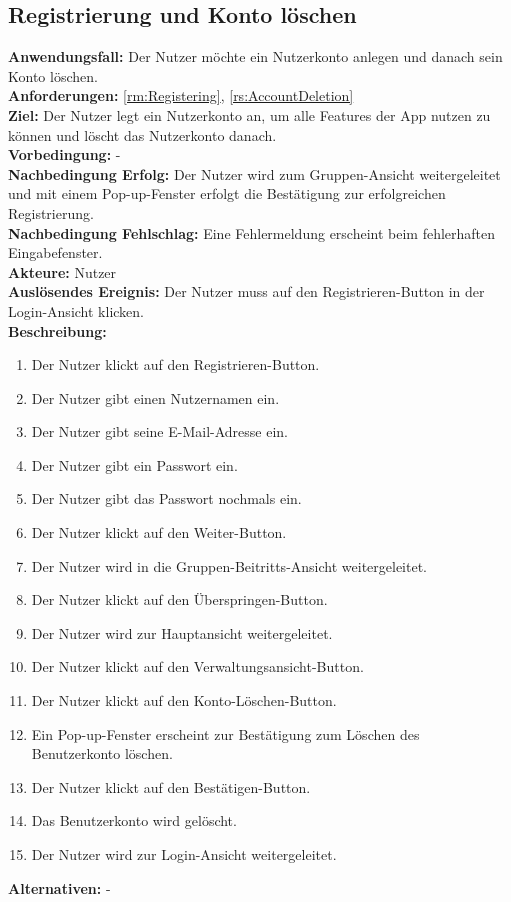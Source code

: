 \documentclass[parskip=full]{scrartcl}
\begin{document}
\subsection{Registrierung und Konto löschen}
\textbf{Anwendungsfall:} Der Nutzer möchte ein Nutzerkonto anlegen und danach sein Konto löschen.\\
\textbf{Anforderungen:} \ref{rm:Registering}, \ref{rs:AccountDeletion} \\
\textbf{Ziel:} Der Nutzer legt ein Nutzerkonto an, um alle Features der App nutzen zu können und löscht das Nutzerkonto danach.\\
\textbf{Vorbedingung:} -\\
\textbf{Nachbedingung Erfolg:} Der Nutzer wird zum Gruppen-Ansicht weitergeleitet und mit einem Pop-up-Fenster erfolgt die Bestätigung zur erfolgreichen Registrierung.\\
\textbf{Nachbedingung Fehlschlag:} Eine Fehlermeldung erscheint beim fehlerhaften Eingabefenster.\\
\textbf{Akteure:} Nutzer\\
\textbf{Auslösendes Ereignis:} Der Nutzer muss auf den Registrieren-Button in der Login-Ansicht klicken.\\
\textbf{Beschreibung:}
\begin{enumerate}
    \item Der Nutzer klickt auf den Registrieren-Button.
    \item Der Nutzer gibt einen Nutzernamen ein.
    \item Der Nutzer gibt seine E-Mail-Adresse ein.
    \item Der Nutzer gibt ein Passwort ein.
    \item Der Nutzer gibt das Passwort nochmals ein.
    \item Der Nutzer klickt auf den Weiter-Button.
    \item Der Nutzer wird in die Gruppen-Beitritts-Ansicht weitergeleitet.
    \item Der Nutzer klickt auf den Überspringen-Button.
    \item Der Nutzer wird zur Hauptansicht weitergeleitet.
    \item Der Nutzer klickt auf den Verwaltungsansicht-Button.
    \item Der Nutzer klickt auf den Konto-Löschen-Button.
    \item Ein Pop-up-Fenster erscheint zur Bestätigung zum Löschen des Benutzerkonto löschen.
    \item Der Nutzer klickt auf den Bestätigen-Button.
    \item Das Benutzerkonto wird gelöscht.
    \item Der Nutzer wird zur Login-Ansicht weitergeleitet.
\end{enumerate}
\textbf{Alternativen:} -
\newpage
\end{document}
